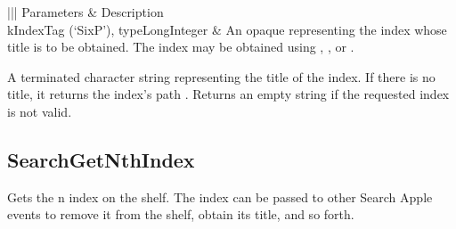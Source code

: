\documentclass[letterpaper,12pt,english,openany,oneside]{sphinxmanual}
\begin{document}
\begin{savenotes}\sphinxattablestart
\centering
{}\label{\detokenize{IAC_API_SearchIntro:section-12}}\nobreak
\begin{tabular}[t]{|||}
\hline
\sphinxstyletheadfamily 
Parameters
&\sphinxstyletheadfamily 
Description
\\
\hline
kIndexTag (‘SixP’), typeLongInteger
&
An opaque  representing the index whose title is to be obtained. The index may be obtained using  ,  , or  .
\\
\hline
\end{tabular}
\par
\sphinxattableend\end{savenotes}


\begin{sphinxVerbatim}[commandchars=\\\{\}]
  
\end{sphinxVerbatim}

A  \sphinxhyphen{}terminated character string representing the title of the index. If there is no title, it returns the index’s path . Returns an empty string if the requested index is not valid.




\subsection{SearchGetNthIndex}
\label{\detokenize{IAC_API_SearchIntro:searchgetnthindex}}
Gets the n  index on the shelf. The index can be passed to other Search Apple events to remove it from the shelf, obtain its title, and so forth.

\label{\detokenize{IAC_API_SearchIntro:apple-event-id-8}}

\begin{sphinxVerbatim}[commandchars=\\\{\}]
 
\end{sphinxVerbatim}
\label{\detokenize{IAC_API_SearchIntro:parameters-7}}
\end{document}
